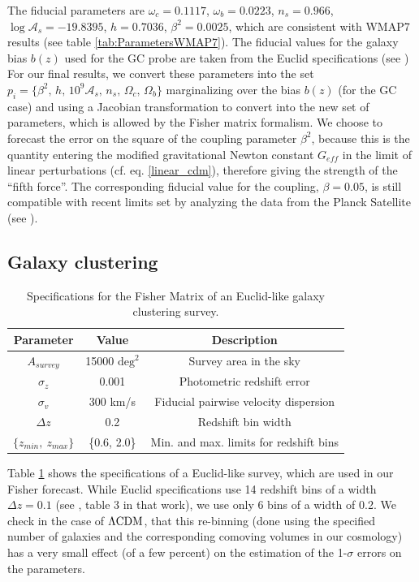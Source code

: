The fiducial parameters are $\omega_{c}=0.1117$, $\omega_{b}=0.0223$,
$n_{s}=0.966$, $\log\mathcal{A}_{s}=-19.8395$, $h=0.7036$, $\beta^{2}=0.0025$,
which are consistent with WMAP7 results (see table \ref{tab:ParametersWMAP7}).
The fiducial values for the galaxy bias $b(z)$ used for the GC probe
are taken from the Euclid specifications (see \cite{amendola_cosmology_2012-short,laureijs_euclid_2011,orsi2010probing})
For our final results, we convert these parameters into the set $p_{i}=\{\beta^{2},\, h,\,10^{9}\mathcal{A}_{s},\, n_{s},\,\Omega_{c},\,\Omega_{b}\}$
marginalizing over the bias $b(z)$ (for the GC case) and using a
Jacobian transformation to convert into the new set of parameters,
which is allowed by the Fisher matrix formalism. We choose to forecast
the error on the square of the coupling parameter $\beta^{2}$, because
this is the quantity entering the modified gravitational Newton constant
$G_{eff}$ in the limit of linear perturbations (cf. eq. \ref{linear_cdm}),
therefore giving the strength of the ``fifth force''. The corresponding
fiducial value for the coupling, $\beta=0.05$, is still compatible
with recent limits set by analyzing the data from the Planck Satellite
(see \cite{pettorino_testing_2013,planckcollaboration_planck2015_2015}).


\subsection{Galaxy clustering}

\begin{table}
\centering{}%
\begin{tabular}{|c|c|c|}
\hline 
\textbf{Parameter}  & \textbf{Value}  & \textbf{Description}\tabularnewline
\hline 
$A_{survey}$  & 15000 $\mbox{deg}^{2}$  & Survey area in the sky\tabularnewline
$\sigma_{z}$  & 0.001  & Photometric redshift error\tabularnewline
$\sigma_{v}$  & 300 km/s  & Fiducial pairwise velocity dispersion\tabularnewline
$\Delta z$  & 0.2  & Redshift bin width\tabularnewline
$\{z_{min},\ z_{max}\}$  & \{0.6, 2.0\}  & Min. and max. limits for redshift bins \tabularnewline
\hline 
\end{tabular}\protect\protect
\caption[Specifications for a Euclid GC survey forecast.]{\label{tab:GC-specifications-CDE} Specifications for the Fisher Matrix
of an Euclid-like galaxy clustering survey.}
\end{table}


Table \ref{tab:GC-specifications-CDE} shows the specifications of a Euclid-like
survey, which are used in our Fisher forecast. While Euclid specifications
use 14 redshift bins of a width $\Delta z=0.1$ (see \cite{amendola_cosmology_2012-short},
table 3 in that work), we use only 6 bins of a width of 0.2. We check
in the case of $\Lambda\mathrm{CDM}$, that this re-binning (done using the specified
number of galaxies and the corresponding comoving volumes in our cosmology)
has a very small effect (of a few percent) on the estimation of the
1-$\sigma$ errors on the parameters.

